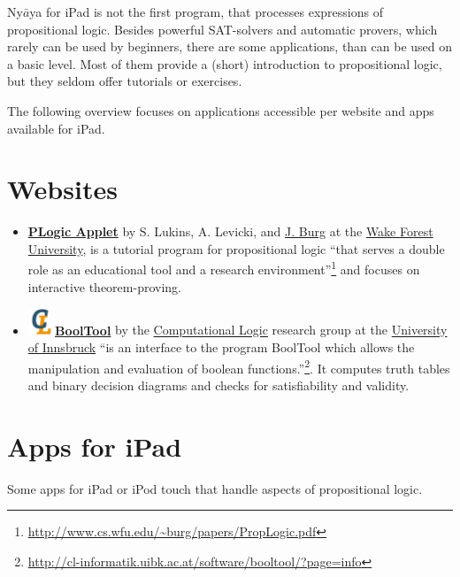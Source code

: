 
Ny$\bar{a}$ya for iPad is not the first program,  that processes expressions of propositional logic. 
Besides powerful SAT-solvers and automatic provers, which rarely can be used by beginners,
there are some applications, than can be used on a basic level.  
Most of them provide a (short) introduction to propositional logic, but they seldom offer tutorials or exercises. 	

The following overview focuses on applications accessible
per website and apps available for iPad.

\section{Websites}

\begin{itemize}
\item 
\href{http://www.cs.wfu.edu/~burg/JavaPackages/indexswingnet.html}{\bf PLogic Applet} 
by S. Lukins, A. Levicki, and 
\href{http://www.cs.wfu.edu/~burg}{J. Burg} at the
\href{http://www.cs.wfu.edu}{Wake Forest University}, is a
tutorial program for propositional logic 
“that serves a double role as an educational tool and a research environment”\footnote {
\url{http://www.cs.wfu.edu/~burg/papers/PropLogic.pdf}} and focuses 
 on interactive theorem-proving.

\item
\href{http://cl-informatik.uibk.ac.at/software/booltool/}{\bf 
\includegraphics[width=0.8cm]{clshortlogo_new.pdf}BoolTool} 
by the 
\href{http://cl-informatik.uibk.ac.at/}{Computational Logic} 
research group at the 
\href{http://informatik.uibk.ac.at}{University of Innsbruck}
“is an interface to the program BoolTool which allows the manipulation and evaluation of boolean functions.”\footnote{
\url{http://cl-informatik.uibk.ac.at/software/booltool/?page=info}}. 
It computes truth tables and binary decision diagrams and checks for satisfiability and validity.

\end{itemize}

\section{Apps for iPad}
 
Some apps for iPad or iPod touch that handle aspects of propositional logic.

